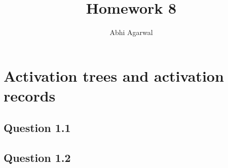 \documentclass[11pt, oneside]{article}   	%
\title{Homework 8}
\author{Abhi Agarwal}
\date{}
\begin{document}
\maketitle

\section{Activation trees and activation records}

\subsection{Question 1.1}

\subsection{Question 1.2}
\end{document}
